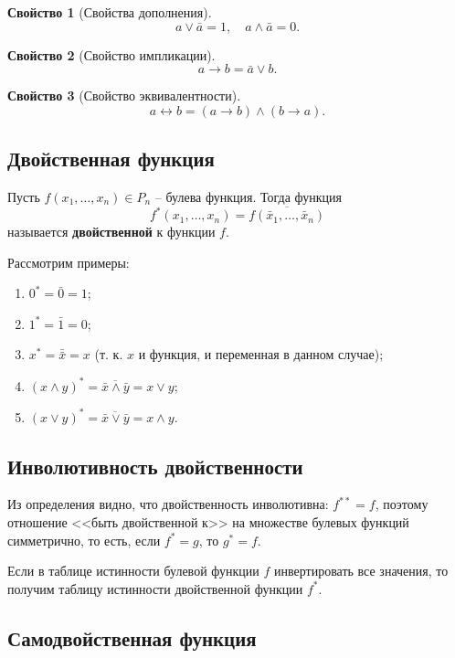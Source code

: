 \documentclass[a5paper, 11pt]{extarticle}
\theoremstyle{definition}
\newtheorem{property}{Свойство}[subsection]
\theoremstyle{definition}
\theoremstyle{definition}
\numberwithin{figure}{section}
\numberwithin{table}{section}
\begin{document}
\begin{property}[Свойства дополнения]
    \[
        a \lor \bar{a} = 1,
        \quad
        a \land \bar{a} = 0.
    \]
\end{property}

\begin{property}[Свойство импликации]
    \[
        a \to b = \bar{a} \lor b.
    \]
\end{property}

\begin{property}[Свойство эквивалентности]
    \[
        a \leftrightarrow b = (a \to b) \land (b \to a).
    \]
\end{property}

\subsection{Двойственная функция}

Пусть \(f(x_1, \ldots, x_n) \in P_n\) -- булева функция. Тогда функция
\[
    f^*(x_1, \ldots, x_n) = \overline{f(\bar{x}_1, \ldots, \bar{x}_n)}
\]
называется \textbf{двойственной} к функции \(f\).

Рассмотрим примеры:
\begin{enumerate}
    \item \(0^* = \bar{0} = 1\);
    \item \(1^* = \bar{1} = 0\);
    \item \(x^* = \bar{\bar{x}} = x\) (т. к. \(x\) и функция, и переменная в данном случае);
    \item \((x \land y)^* = \overline{\bar{x} \land \bar{y}} = x \lor y\);
    \item \((x \lor y)^* = \overline{\bar{x} \lor \bar{y}} = x \land y\).
\end{enumerate}

\subsection{Инволютивность двойственности}

Из определения видно, что двойственность инволютивна: \(f^{**} = f\), поэтому отношение <<быть двойственной к>> на множестве булевых функций симметрично, то есть, если \(f^* = g\), то \(g^* = f\).

Если в таблице истинности булевой функции \(f\) инвертировать все значения, то получим таблицу истинности двойственной функции \(f^*\).

\subsection{Самодвойственная функция}
\end{document}
